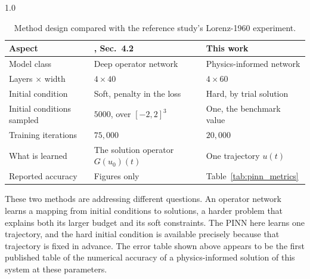 \begin{table}[H]
\centering
\caption{Method design compared with the reference study's Lorenz-1960 experiment.}
\label{tab:method_comparison}
\begin{spacing}{1.0}
\small
\begin{tabularx}{\textwidth}{|p{3.6cm}|>{\raggedright\arraybackslash}X|>{\raggedright\arraybackslash}X|}
\hline
\textbf{Aspect} & \textbf{\cite{matthews2024pinnde}, Sec.~4.2} & \textbf{This work} \\
\hline
Model class & Deep operator network & Physics-informed network \\
\hline
Layers $\times$ width & $4 \times 40$ & $4 \times 60$ \\
\hline
Initial condition & Soft, penalty in the loss & Hard, by trial solution \\
\hline
Initial conditions sampled & $5000$, over $[-2,2]^3$ & One, the benchmark value \\
\hline
Training iterations & $75{,}000$ & $20{,}000$ \\
\hline
What is learned & The solution operator $G(u_0)(t)$ & One trajectory $u(t)$ \\
\hline
Reported accuracy & Figures only & Table~\ref{tab:pinn_metrics} \\
\hline
\end{tabularx}
\end{spacing}
\end{table}

These two methods are addressing different questions. An operator network learns a mapping from initial conditions to solutions, a harder problem that explains both its larger budget and its soft constraints. The PINN here learns one trajectory, and the hard initial condition is available precisely because that trajectory is fixed in advance. The error table shown above appears to be the first published table of the numerical accuracy of a physics-informed solution of this system at these parameters.
